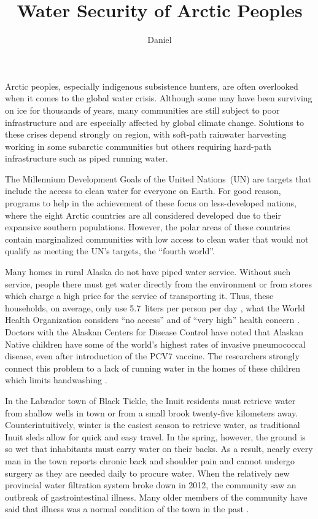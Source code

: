 \documentclass[american]{../../../coursework}
\title{Water Security of Arctic Peoples}
\subtitle{}
\author{Daniel}{Glenn}{Leonard}
\date{\displaydate{date}}
\begin{document}
\maketitle

Arctic peoples, especially indigenous subsistence hunters, are often
overlooked when it comes to the global water crisis. Although some may have
been surviving on ice for thousands of years, many communities are still
subject to poor infrastructure and are especially affected by global climate
change. Solutions to these crises depend strongly on region, with soft-path
rainwater harvesting working in some subarctic communities but others
requiring hard-path infrastructure such as piped running water.

The Millennium Development Goals of the United Nations~(UN) are targets that
include the access to clean water for everyone on Earth. For good reason,
programs to help in the achievement of these focus on less-developed nations,
where the eight Arctic countries are all considered developed due to their
expansive southern populations. However, the polar areas of these countries
contain marginalized communities with low access to clean water that would not
qualify as meeting the UN's targets, the \enquote{fourth world}.

Many homes in rural Alaska do not have piped water service. Without such
service, people there must get water directly from the environment or from
stores which charge a high price for the service of transporting it. Thus,
these households, on average, only use 5.7~liters per person per day
\parencite{Hennessy2016}, what the World Health Organization considers
\enquote{no access} and of \enquote{very high} health concern
\parencite{Howard2003}. Doctors with the Alaskan Centers for Disease Control
have noted that Alaskan Native children have some of the world's highest rates
of invasive pneumococcal disease, even after introduction of the PCV7 vaccine.
The researchers strongly connect this problem to a lack of running water in
the homes of these children which limits handwashing \parencite{Wenger2010}.

In the Labrador town of Black Tickle, the Inuit residents must retrieve water
from shallow wells in town or from a small brook twenty-five kilometers away.
Counterintuitively, winter is the easiest season to retrieve water, as
traditional Inuit sleds allow for quick and easy travel. In the spring,
however, the ground is so wet that inhabitants must carry water on their
backs. As a result, nearly every man in the town reports chronic back and
shoulder pain and cannot undergo surgery as they are needed daily to procure
water. When the relatively new provincial water filtration system broke down
in 2012, the community saw an outbreak of gastrointestinal illness. Many older
members of the community have said that illness was a normal condition of the
town in the past \parencite{Hanrahan2014}.
\end{document}
